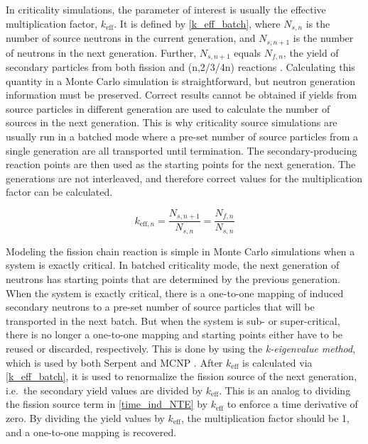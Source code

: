 In criticality simulations, the parameter of interest is usually the effective multiplication factor, $k_\mathrm{eff}$.  It is defined by \eqref{k_eff_batch}, where $N_{s,n}$ is the number of source neutrons in the current generation, and $N_{s,n+1}$ is the number of neutrons in the next generation. Further, $N_{s,n+1}$ equals $N_{f,n}$, the yield of secondary particles from both fission and (n,2/3/4n) reactions \cite{jaakko}.  Calculating this quantity in a Monte Carlo simulation is straightforward, but neutron generation information must be preserved.  Correct results cannot be obtained if yields from source particles in different generation are used to calculate the number of sources in the next generation.  This is why criticality source simulations are usually run in a batched mode where a pre-set number of source particles from a single generation are all transported until termination.  The secondary-producing reaction points are then used as the starting points for the next generation.  The generations are not interleaved, and therefore correct values for the multiplication factor can be calculated.

\begin{equation}
\label{k_eff_batch}
k_{\mathrm{eff},n} = \frac{N_{s,n+1}}{N_{s,n}} = \frac{N_{f,n}}{N_{s,n}}
\end{equation}

Modeling the fission chain reaction is simple in Monte Carlo simulations when a system is exactly critical.  In batched criticality mode, the next generation of neutrons has starting points that are determined by the previous generation.  When the system is exactly critical, there is a one-to-one mapping of induced secondary neutrons to a pre-set number of source particles that will be transported in the next batch.  But when the system is sub- or super-critical, there is no longer a one-to-one mapping and starting points either have to be reused or discarded, respectively.  This is done by using the \emph{k-eigenvalue method}, which is used by both Serpent and MCNP \cite{jaakko,mcnp}.%
 After $k_\mathrm{eff}$ is calculated via \eqref{k_eff_batch}, it is used to renormalize the fission source of the next generation, i.e.\ the secondary yield values are divided by $k_\mathrm{eff}$.  This is an analog to dividing the fission source term in \eqref{time_ind_NTE} by $k_\mathrm{eff}$ to enforce a time derivative of zero.  By dividing the yield values by $k_\mathrm{eff}$, the multiplication factor should be 1, and a one-to-one mapping is recovered.  
 
